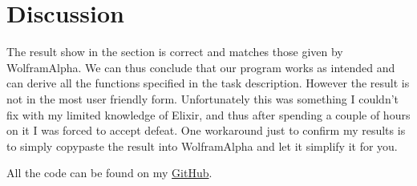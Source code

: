 \documentclass[a4paper,11pt]{article}
\begin{document}
\section*{Discussion}
The result show in the section is correct and matches those given by WolframAlpha. We can thus conclude that our program 
works as intended and can derive all the functions specified in the task description. However the result is not in the 
most user friendly form. Unfortunately this was something I couldn't fix with my limited knowledge of Elixir, and thus after
spending a couple of hours on it I was forced to accept defeat. One workaround just to confirm my results is to simply 
copypaste the result into WolframAlpha and let it simplify it for you. 

All the code can be found on my 
\href{https://github.com/adrian-jonsson-sjoedin/ID1019-Programming-II/tree/main/Task1_Solution}{GitHub}.
\end{document}
